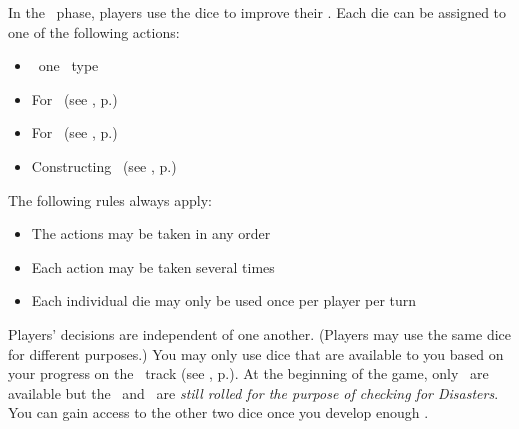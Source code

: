 In the \development\ phase, players use the dice to improve their \planets. Each die can be assigned to one of the following actions:
\begin{itemize}
	\item \activating\ one \fortification\ type
	\item For \trade\ (see , p.\pageref{sec:trade})
	\item For \culture\ (see , p.\pageref{sec:culture})
  \item Constructing \fortifications\ (see , p.\pageref{sec:fortifications})
\end{itemize}
The following rules always apply:
\begin{itemize}
	\item The actions may be taken in any order
	\item Each action may be taken several times
	\item Each individual die may only be used once per player per turn
\end{itemize}
Players’ decisions are independent of one another. (Players may use the same dice for different purposes.)
\newline\newline
You may only use dice that are available to you based on your progress on the \tech\ track (see , p.\pageref{sec:technology}).  At the beginning of the game, only \whitedice\ are available but the \bluedie\ and \blackdie\ are \textit{still rolled for the purpose of checking for Disasters}.  You can gain access to the other two dice once you develop enough \tech.
